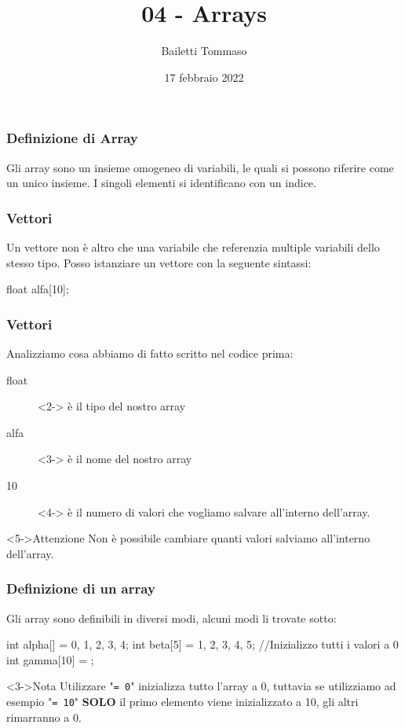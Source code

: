 \documentclass{beamer}
\title{04 - Arrays}
\author{Bailetti Tommaso}
\institute{ITI Don Orione}
\date{17 febbraio 2022}
\begin{document}
    \begin{frame}
        \titlepage
    \end{frame}

    \begin{frame}
        \frametitle{Definizione di Array}
        Gli array sono un insieme omogeneo di variabili, le quali si possono riferire come un unico insieme.
        I singoli elementi si identificano con un indice.
    \end{frame}

    \begin{frame}[fragile]
        \frametitle{Vettori}
        Un vettore non è altro che una variabile che referenzia multiple variabili dello stesso tipo. Posso istanziare un vettore con la seguente sintassi:
        \begin{cppcode}
            float alfa[10];
        \end{cppcode}
    \end{frame}

    \begin{frame}
        \frametitle{Vettori}
        Analizziamo cosa abbiamo di fatto scritto nel codice prima:
        \begin{description}
            \item[float]<2-> è il tipo del nostro array
            \item[alfa]<3-> è il nome del nostro array
            \item[10]<4-> è il numero di valori che vogliamo salvare all'interno dell'array.  
        \end{description}
        \begin{block}<5->{Attenzione}
            Non è possibile cambiare quanti valori salviamo all'interno dell'array.
        \end{block}
    \end{frame}

    \begin{frame}[fragile]
        \frametitle{Definizione di un array}
    
        Gli array sono definibili in diversi modi, alcuni modi li trovate sotto:
        \begin{cppcode}
            int alpha[] = {0, 1, 2, 3, 4};
            int beta[5] = {1, 2, 3, 4, 5};
            //Inizializzo tutti i valori a 0
            int gamma[10] = {}; 
        \end{cppcode}
        \begin{block}<3->{Nota}
            Utilizzare "\texttt{= {0}}" inizializza tutto l'array a 0, tuttavia se utilizziamo ad esempio "\texttt{= {10}}" \textbf{SOLO} il primo elemento viene inizializzato a 10, gli altri rimarranno a 0.
        \end{block}
    
    \end{frame}
    
\end{document}
